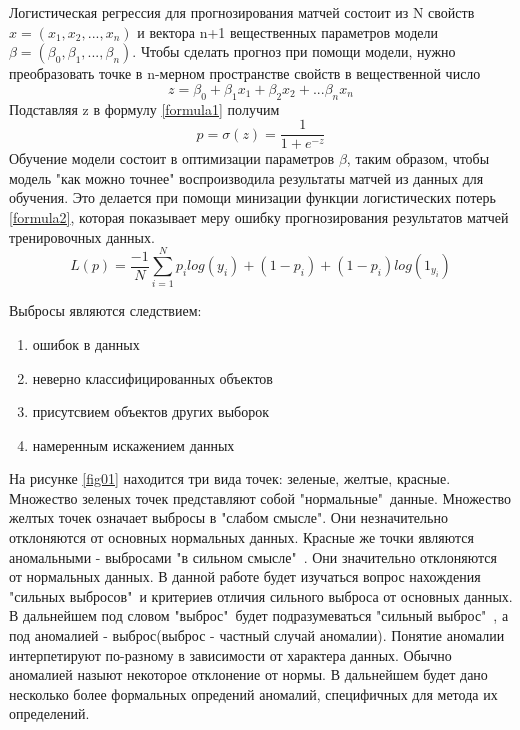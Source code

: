 Логистическая регрессия для прогнозирования матчей состоит из N свойств $x=(x_1,x_2, ..., x_n)$ и вектора
n+1 вещественных параметров модели $\beta=(\beta_0,\beta_1,...,\beta_n)$. Чтобы сделать прогноз при помощи модели, нужно преобразовать точке в n-мерном пространстве свойств  в вещественной число
\begin{equation}
z=\beta_0 +\beta_1x_1+\beta_2x_2+...\beta_nx_n
\end{equation}
Подставляя z в формулу \ref{formula1} получим 
\begin{equation}\label{formula1}
p=\sigma(z)=\frac{1}{1 + e^{-z}}
\end{equation}
Обучение модели состоит в оптимизации параметров $\beta$, таким образом, чтобы модель "как можно точнее" воспроизводила результаты матчей из данных для обучения. Это делается при помощи минизации функции логистических потерь \ref{formula2}, которая показывает меру ошибку прогнозирования результатов матчей тренировочных данных.
\begin{equation}\label{formula2}
L(p)=\frac{-1}{N}\sum_{i=1}^Np_ilog(y_i) + (1 - p_i) + (1 - p_i)log(1_y_i)
\end{equation}







Выбросы являются следствием:
\begin{enumerate}
	\item ошибок в данных
	\item неверно классифицированных объектов
	\item присутсвием объектов других выборок
	\item намеренным искажением данных
\end{enumerate}
На рисунке \ref{fig01} находится три вида точек: зеленые, желтые, красные. Множество зеленых точек представляют собой "нормальные"\ данные. Множество желтых точек означает  выбросы в "слабом смысле". Они незначительно отклоняются от основных  нормальных данных. Красные же точки являются аномальными - выбросами "в сильном смысле"\ . Они значительно  отклоняются  от нормальных данных. В данной работе будет изучаться вопрос нахождения "сильных выбросов"\  и  критериев отличия сильного выброса от основных данных. В дальнейшем под словом "выброс"\ будет подразумеваться "сильный выброс"\ ,  а под  аномалией -  выброс(выброс - частный случай аномалии).
Понятие аномалии  интерпетируют по-разному в зависимости от характера данных. Обычно аномалией назыют некоторое отклонение от нормы. В дальнейшем будет дано несколько более формальных опредений аномалий, специфичных для метода их определений.


